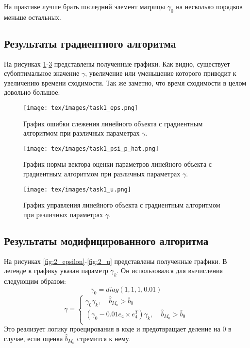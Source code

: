 \documentclass{article}
\begin{document}
На практике лучше брать последний элемент матрицы \(\gamma_0\) на несколько порядков меньше остальных.
\FloatBarrier

\subsection{Результаты градиентного алгоритма}
На рисунках \ref{fig:1_epsilon}-\ref{fig:1_u} представлены полученные графики. Как видно, существует субоптимальное значение \(\gamma\), увеличение или уменьшение которого приводит к увеличению времени сходимости. Так же заметно, что время сходимости в целом довольно большое.
\begin{figure}[h!]
  \centering
  \texttt{[image: tex/images/task1\_eps.png]}
  \caption{График ошибки слежения линейного объекта с градиентным алгоритмом при различных параметрах \(\gamma\).} 
  \label{fig:1_epsilon}
\end{figure}
\begin{figure}[h!]
  \centering
  \texttt{[image: tex/images/task1\_psi\_p\_hat.png]}
  \caption{График нормы вектора оценки параметров линейного объекта с градиентным алгоритмом при различных параметрах \(\gamma\).} 
  \label{fig:1_psi_p_hat_hat}
\end{figure}
\begin{figure}[h!]
  \centering
  \texttt{[image: tex/images/task1\_u.png]}
  \caption{График управления линейного объекта с градиентным алгоритмом при различных параметрах \(\gamma\).} 
  \label{fig:1_u}
\end{figure}
\FloatBarrier
\newpage

\subsection{Результаты модифицированного алгоритма}

На рисунках \ref{fig:2_epsilon}-\ref{fig:2_u} представлены полученные графики. В легенде к графику указан параметр \(\gamma_k\). Он использовался для вычисления следующим образом:
\[\gamma_0 = diag(1, 1, 1, 0.01)\]
\[
\gamma = 
\begin{cases}
  \gamma_0\gamma_k,~~~~~\hat b_{M_0} > \bar b_0 \\
  (\gamma_0 - 0.01 e_{4} \times e_{4}^T)\gamma_k,~~~~~\hat b_{M_0} > \bar b_0 \\
\end{cases}\]
Это реализует логику проецирования в коде и предотвращает деление на 0 в случае, если оценка \(\hat b_{M_0}\) стремится к нему.
\end{document}
